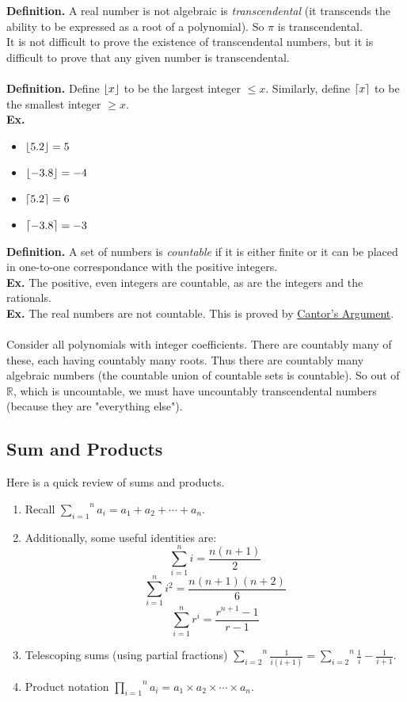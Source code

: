 \documentclass[class=article, crop=false]{standalone}
\def\inlinesum#1#2{\overset{#2}{\underset{#1}{\sum}}}
\def\inlineprod#1#2{\overset{#2}{\underset{#1}{\prod}}}
\DeclarePairedDelimiter\ceil{\lceil}{\rceil}
\DeclarePairedDelimiter\floor{\lfloor}{\rfloor}
\begin{document}
\textbf{Definition.} A real number is not algebraic is \emph{transcendental} (it transcends the ability to be expressed as a root of a polynomial).
So $\pi$ is transcendental.\\
It is not difficult to prove the existence of transcendental numbers, but it is difficult to prove that any given number is transcendental.\\\\
\textbf{Definition.} Define $\floor{x}$ to be the largest integer $\leq x$. Similarly, define $\ceil{x}$ to be the smallest integer $\geq x$.\\
\textbf{Ex.}
	\begin{itemize}
		\item $\floor{5.2} = 5$
		\item $\floor{-3.8} = -4$
		\item $\ceil{5.2} = 6$
		\item $\ceil{-3.8} = -3$
	\end{itemize}
\textbf{Definition.} A set of numbers is \emph{countable} if it is either finite or it can be placed in one-to-one correspondance
with the positive integers.\\
\textbf{Ex.} The positive, even integers are countable, as are the integers and the rationals.\\
\textbf{Ex.} The real numbers are not countable. This is proved by \href{https://jlmartin.ku.edu/~jlmartin/courses/math410-S13/cantor.pdf}{Cantor's Argument}.\\\\
Consider all polynomials with integer coefficients. There are countably many of these, each having countably many roots.
Thus there are countably many algebraic numbers (the countable union of countable sets is countable). So out of $\mathbb{R}$,
which is uncountable, we must have uncountably transcendental numbers (because they are "everything else").

\subsection{Sum and Products}
Here is a quick review of sums and products.
\begin{enumerate}[1.]
	\item Recall $\inlinesum{i=1}{n}a_i = a_1 + a_2 + \cdots + a_n$.
	\item Additionally, some useful identities are: $$\sum_{i=1}^{n} i = \frac{n(n+1)}{2}$$ 
	$$\sum_{i=1}^{n} i^2 = \frac{n(n+1)(n+2)}{6}$$
	$$\sum_{i=1}^{n} r^i = \frac{r^{n+1}-1}{r-1}$$
	\item Telescoping sums (using partial fractions) $\inlinesum{i=2}{n}\frac{1}{i(i+1)} = \inlinesum{i=2}{n}\frac{1}{i}-\frac{1}{i+1}$.
	\item Product notation $\inlineprod{i=1}{n} a_i = a_1 \times a_2 \times\cdots\times a_n$.
\end{enumerate}
\end{document}
